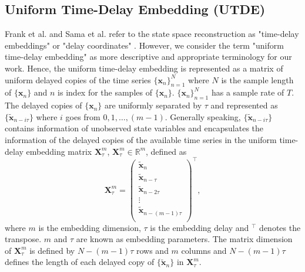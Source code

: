 \documentclass[fleqn,10pt]{wlscirep}
\begin{document}
\subsection*{Uniform Time-Delay Embedding (UTDE)}\label{sec:utimedelayembedding}
Frank et al. and Sama et al. refer to the state space reconstruction
as "time-delay embeddings" or "delay coordinates" \cite{frank2010, sama2013}. 
However, we consider the term "uniform time-delay embedding"
as more descriptive and appropriate terminology for our work.
Hence, the uniform time-delay embedding is represented as a matrix of uniform delayed 
copies of the time series $\{ \boldsymbol{x}_n \}_{n=1}^N$ where $N$ is 
the sample length of $\{ \boldsymbol{x}_n \}$ and $n$ is index for the 
samples of $\{ \boldsymbol{x}_n \}$.
$\{ \boldsymbol{x}_n \}_{n=1}^N$ has a sample rate of $T$.
The delayed copies of $\{ \boldsymbol{x}_n \}$ are uniformly separated by $\tau$
and represented as $\{\boldsymbol{ \tilde{x} }_{n- i\tau} \}$
where $i$ goes from $0,1, \dots, (m-1)$.
Generally speaking, $\{\boldsymbol{ \tilde{x} }_{n- i\tau} \}$ contains
information of unobserved state variables and encapsulates the information of
the delayed copies of the available time series in the uniform time-delay 
embedding matrix $\boldsymbol{X}^{m}_{\tau}$, 
$\boldsymbol{X}^{m}_{\tau} \in \mathbb{R}^m$, defined as
\begin{equation}\label{eq:tde}
\boldsymbol{X}^{m}_{\tau}  =
\begin{pmatrix}
\boldsymbol{ \tilde{x} }_n \\
\boldsymbol{ \tilde{x} }_{n-\tau} \\
\boldsymbol{ \tilde{x} }_{n-2\tau} \\
\vdots \\
\boldsymbol{ \tilde{x} }_{n- (m-1) \tau} \\
\end{pmatrix}^\intercal, 
\end{equation}
where $m$ is the embedding dimension, $\tau$ is the embedding delay and
$ ^\intercal$ denotes the transpose.
$m$ and $\tau$ are known as embedding parameters.
The matrix dimension of $ \boldsymbol{X}_{\tau}^{m} $ is defined by
$N-(m-1)\tau$ rows and $m$ columns and 
$N-(m-1)\tau$ defines the length of each delayed copy 
of $\{ \boldsymbol{ \tilde{x} }_n \}$ in $\boldsymbol{X}^{m}_{\tau}$.
\end{document}
